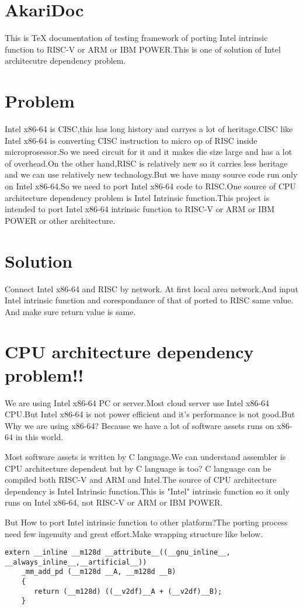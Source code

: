 \documentclass[dvipdfmx]{jsarticle}
\begin{document}
\section{AkariDoc}
This is TeX documentation of testing framework of porting Intel intrinsic function to RISC-V or ARM or IBM POWER.This is one of solution of Intel architecutre dependency problem.\\

\section{Problem}
Intel x86-64 is CISC,this has long history and carryes a lot of heritage.CISC like Intel x86-64 is converting CISC instruction to micro op of RISC inside microprosessor.So we need circuit for it and it makes die size large and has a lot of overhead.On the other hand,RISC is relatively new so it carries less heritage and we can use relatively new technology.But we have many source code run only on Intel x86-64.So we need to port Intel x86-64 code to RISC.One source of CPU architecture dependency problem is Intel Intrinsic function.This project is intended to port Intel x86-64 intrinsic function to RISC-V or ARM or IBM POWER or other architecture.\\

\section{Solution}
Connect Intel x86-64 and RISC by network. At first local area network.And input Intel intrinsic function and corespondance of that of ported to RISC same value. And make sure return value is same.\\

\section{CPU architecture dependency problem!!}
We are using Intel x86-64 PC or server.Most cloud server use Intel x86-64 CPU.But Intel x86-64 is not power efficient and it's performance is not good.But Why we are using x86-64? Because we have a lot of software assets runs on x86-64 in this world.

Most software assets is written by C language.We can understand assembler is CPU architecture dependent but by C language is too? C language can be compiled both RISC-V and ARM and Intel.The source of CPU architecture dependency is Intel Intrinsic function.This is "Intel" intrinsic function so it only runs on Intel x86-64, not RISC-V or ARM or IBM POWER.

But How to port Intel intrinsic function to other platform?The porting process need few ingenuity and great effort.Make wrapping structure like below.




\begin{lstlisting}[caption=hoge,label=fuga]
    extern __inline __m128d __attribute__((__gnu_inline__, __always_inline__,__artificial__))
    _mm_add_pd (__m128d __A, __m128d __B)
    {
       return (__m128d) ((__v2df)__A + (__v2df)__B);
    }
\end{lstlisting}
\end{document}
